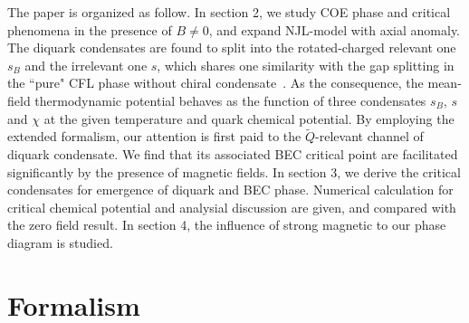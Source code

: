 \documentclass[prd, showpacs,nofootinbib,amsmath,amssymb]{revtex4}
\begin{document}
The paper is organized as follow. In section 2, we study COE phase and critical phenomena in the presence of $B\neq0$, and expand NJL-model with axial anomaly.
The diquark condensates are found to split into the rotated-charged relevant one $s_B$ and the irrelevant one $s$, which shares one similarity with the gap splitting in the ``pure" CFL phase without chiral condensate~\cite{ferrer2005magnetic,fukushima2008color,ferrer2006color,ferrer2007magnetic}.
As the consequence, the mean-field thermodynamic potential behaves as the function of three condensates $s_B$, $s$ and $\chi$ at the given temperature and quark chemical potential.
By employing the extended formalism, our attention is first paid to the ${\widetilde{Q}}$-relevant channel of diquark condensate. We find that its associated BEC critical point are facilitated significantly by the presence of magnetic fields.
In section 3, we derive the critical condensates for emergence of diquark and BEC phase.
Numerical calculation for critical chemical potential and analysial discussion are given, and compared with the zero field result.
In section 4, the influence of strong magnetic to our phase diagram is studied.



\section{Formalism}
\end{document}
